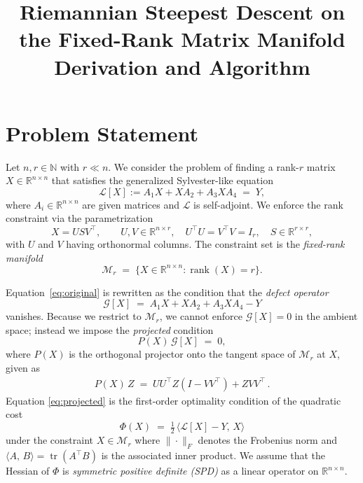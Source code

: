 \documentclass[12pt,a4paper]{article}
\title{Riemannian Steepest Descent on the Fixed-Rank Matrix Manifold\\
\large Derivation and Algorithm}
\author{}
\date{}
\newcommand{\R}{\mathbb{R}}
\newcommand{\cL}{\mathcal{L}}
\newcommand{\cG}{\mathcal{G}}
\newcommand{\cM}{\mathcal{M}}
\newcommand{\tr}{\operatorname{tr}}
\newcommand{\inner}[2]{\langle #1,\, #2 \rangle}
\begin{document}
\maketitle

\section{Problem Statement}

Let $n, r \in \mathbb{N}$ with $r \ll n$. We consider the problem of finding a
rank-$r$ matrix $X \in \R^{n \times n}$ that satisfies the generalized
Sylvester-like equation
\begin{equation}\label{eq:original}
    \cL[X] := A_1 X + X A_2 + A_3 X A_4 \;=\; Y,
\end{equation}
where $A_i \in \R^{n \times n}$ are given matrices and $\mathcal{L}$ is self-adjoint. We enforce the
rank constraint via the parametrization
\begin{equation}\label{eq:factorization}
    X = U S V^\top, \qquad U, V \in \R^{n \times r},\quad
    U^\top U = V^\top V = I_r,\quad S \in \R^{r \times r},
\end{equation}
with $U$ and $V$ having orthonormal columns. The constraint set is the \emph{fixed-rank manifold}
\begin{equation}
    \cM_r \;=\; \bigl\{X \in \R^{n \times n} : \operatorname{rank}(X) = r\bigr\}.
\end{equation}

Equation~\eqref{eq:original} is rewritten as the condition that the
\emph{defect operator}
\begin{equation}\label{eq:operator}
    \cG[X] \;=\; A_1X + XA_2 + A_3 X A_4 - Y
\end{equation}
vanishes. Because we restrict to $\cM_r$, we cannot enforce $\cG[X] = 0$
in the ambient space; instead we impose the \emph{projected} condition
\begin{equation}\label{eq:projected}
    P(X)\,\cG[X] \;=\; 0,
\end{equation}
where $P(X)$ is the orthogonal projector onto the tangent space of $\cM_r$
at $X$, given as
\begin{align*}
    P(X)\,Z \;=\; U U^\top Z (I - V V^\top) + Z V V^\top\,.
\end{align*}
Equation \eqref{eq:projected} is the first-order optimality condition of the quadratic cost
\begin{equation}\label{eq:cost}
    \Phi(X) \;=\; \tfrac{1}{2}\,\inner{\cL[X] - Y}{X}
\end{equation}
under the constraint $X\in\mathcal{M}_r$ where $\|\cdot\|_F$ denotes the Frobenius norm and
$\inner{A}{B} = \tr(A^\top B)$ is the associated inner product. We assume that the Hessian of $\Phi$ is \emph{symmetric positive definite
(SPD)} as a linear operator on $\R^{n \times n}$.
\end{document}
